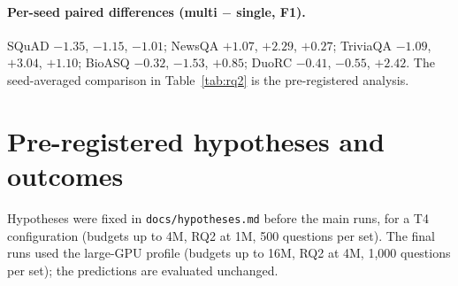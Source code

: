 \documentclass{article}
\begin{document}
\paragraph{Per-seed paired differences (multi $-$ single, F1).} SQuAD $-1.35$, $-1.15$, $-1.01$;
NewsQA $+1.07$, $+2.29$, $+0.27$; TriviaQA $-1.09$, $+3.04$, $+1.10$; BioASQ $-0.32$, $-1.53$, $+0.85$;
DuoRC $-0.41$, $-0.55$, $+2.42$. The seed-averaged comparison in Table~\ref{tab:rq2} is the pre-registered
analysis.

\section{Pre-registered hypotheses and outcomes}
\label{app:hypotheses}

Hypotheses were fixed in \texttt{docs/hypotheses.md} before the main runs, for a T4 configuration
(budgets up to 4M, RQ2 at 1M, 500 questions per set). The final runs used the large-GPU profile
(budgets up to 16M, RQ2 at 4M, 1,000 questions per set); the predictions are evaluated unchanged.
\end{document}
